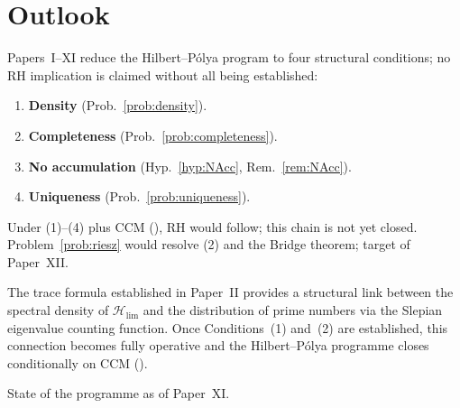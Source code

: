 \documentclass[12pt,a4paper]{amsart}
\theoremstyle{definition}
\theoremstyle{remark}
\newcommand{\Hlim}{\mathcal{H}_{\lim}}
\begin{document}
\section{Outlook}
\label{sec:outlook}

Papers~I--XI reduce the Hilbert--P\'olya
program to four structural conditions;
no RH implication is claimed without all
being established:
\begin{enumerate}
\item \textbf{Density}
      (Prob.~\ref{prob:density}).
\item \textbf{Completeness}
      (Prob.~\ref{prob:completeness}).
\item \textbf{No accumulation}
      (Hyp.~\ref{hyp:NAcc},
      Rem.~\ref{rem:NAcc}).
\item \textbf{Uniqueness}
      (Prob.~\ref{prob:uniqueness}).
\end{enumerate}
Under (1)--(4) plus CCM (\cite{CCM2025}),
RH would follow; this chain is not yet closed.
Problem~\ref{prob:riesz} would resolve (2)
and the Bridge theorem;
target of Paper~XII.

\medskip\noindent
The trace formula established in Paper~II
provides a structural link between the spectral
density of $\Hlim$ and the distribution of prime
numbers via the Slepian eigenvalue counting function.
Once Conditions~(1) and~(2) are established,
this connection becomes fully operative and the
Hilbert--P\'olya programme closes conditionally
on CCM (\cite{CCM2025}).

\medskip\noindent
State of the programme as of Paper~XI.
\end{document}
